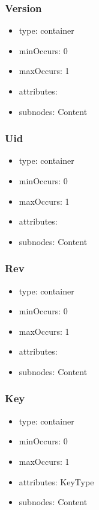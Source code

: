\documentclass[a4paper,11pt]{article}
\begin{document}
\subsubsection{Version}
\begin{itemize}
  \item type: container
  \item minOccurs: 0
  \item maxOccurs: 1
  \item attributes:
  \item subnodes:
  \subitem Content
\end{itemize}

\subsubsection{Uid}
\begin{itemize}
  \item type: container
  \item minOccurs: 0
  \item maxOccurs: 1
  \item attributes:
  \item subnodes:
  \subitem Content
\end{itemize}

\subsubsection{Rev}
\begin{itemize}
  \item type: container
  \item minOccurs: 0
  \item maxOccurs: 1
  \item attributes:
  \item subnodes:
  \subitem Content
\end{itemize}

\subsubsection{Key}
\begin{itemize}
  \item type: container
  \item minOccurs: 0
  \item maxOccurs: 1
  \item attributes: KeyType
  \item subnodes:
  \subitem Content
\end{itemize}
\end{document}
